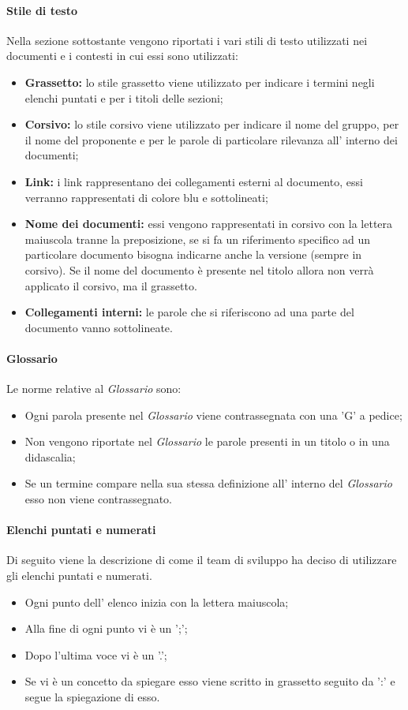 \paragraph{Stile di testo}
Nella sezione sottostante vengono riportati i vari stili di testo utilizzati nei documenti e i contesti in cui essi sono utilizzati:
\begin {itemize}
    \item \textbf{Grassetto:} lo stile grassetto viene utilizzato per indicare i termini negli elenchi puntati e per i titoli delle sezioni;
    \item \textbf{Corsivo:} lo stile corsivo viene utilizzato per indicare il nome del gruppo, per il nome del proponente e per le parole di particolare rilevanza all' interno dei documenti;
    \item \textbf{Link:} i link rappresentano dei collegamenti esterni al documento, essi verranno rappresentati di colore blu e sottolineati;
    \item \textbf{Nome dei documenti:} essi vengono rappresentati in corsivo con la lettera maiuscola tranne la preposizione, se si fa un riferimento specifico ad un particolare documento bisogna indicarne anche la versione (sempre in corsivo).
    Se il nome del documento è presente nel titolo allora non verrà applicato il corsivo, ma il grassetto.
    \item \textbf{Collegamenti interni:} le parole che si riferiscono ad una parte del documento vanno sottolineate.
\end {itemize}
\paragraph{Glossario}
Le norme relative al \textit{Glossario} sono:
\begin{itemize}
    \item Ogni parola presente nel \textit{Glossario} viene contrassegnata con una 'G' a pedice;
    \item Non vengono riportate nel \textit{Glossario} le parole presenti in un titolo o in una didascalia;
    \item Se un termine compare nella sua stessa definizione all' interno del \textit{Glossario} esso non viene contrassegnato.
\end{itemize}
\paragraph{Elenchi puntati e numerati}
Di seguito viene la descrizione di come il team di sviluppo ha deciso di utilizzare gli elenchi puntati e numerati.
\begin {itemize}
    \item Ogni punto dell' elenco inizia con la lettera maiuscola;
    \item Alla fine di ogni punto vi è un ';';
    \item Dopo l'ultima voce vi è un '.';
    \item Se vi è un concetto da spiegare esso viene scritto in grassetto seguito da ':' e segue la spiegazione di esso.
\end {itemize}
